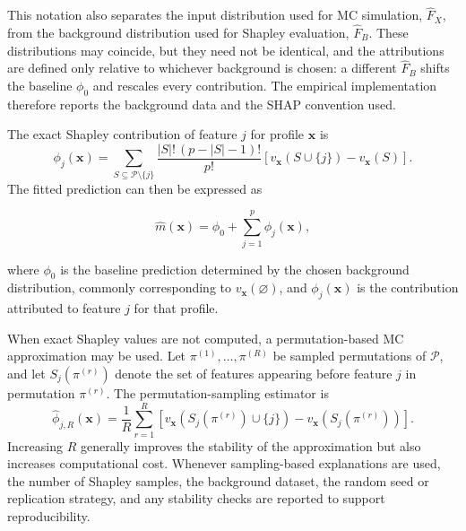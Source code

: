 This notation also separates the input distribution used for MC
simulation, \(\widehat{F}_{X}\), from the background distribution used for
Shapley evaluation, \(\widehat{F}_{B}\). These distributions may coincide,
but they need not be identical, and the attributions are defined only
relative to whichever background is chosen: a different \(\widehat{F}_{B}\)
shifts the baseline \(\phi_{0}\) and rescales every contribution. The
empirical implementation therefore reports the background data and the
SHAP convention used.

\noindent
The exact Shapley contribution of feature \(j\) for profile \(\mathbf{x}\) is
\begin{equation}
\label{eq:shapley_exact}
      \phi_j(\mathbf{x})
      =
      \sum_{S\subseteq\mathcal{P}\setminus\{j\}}
      \frac{|S|!\,(p-|S|-1)!}{p!}
      \left[
          v_{\mathbf{x}}(S\cup\{j\})
          -
          v_{\mathbf{x}}(S)
      \right].
\end{equation}
The fitted prediction can then be expressed as

\begin{equation}
\label{eq:shapley_decomp}
      \widehat{m}(\mathbf{x})
      =
      \phi_0
      +
      \sum_{j=1}^{p}
      \phi_j(\mathbf{x}),
\end{equation}

where \(\phi_0\) is the baseline prediction determined by the chosen background
distribution, commonly corresponding to \(v_{\mathbf{x}}(\varnothing)\), and
\(\phi_j(\mathbf{x})\) is the contribution attributed to feature \(j\) for that
profile.

  \noindent
  When exact Shapley values are not computed, a permutation-based MC
  approximation may be used. Let
  \(\pi^{(1)},\ldots,\pi^{(R)}\) be sampled permutations of \(\mathcal{P}\), and
  let \(S_j(\pi^{(r)})\) denote the set of features appearing before feature \(j\)
  in permutation \(\pi^{(r)}\). The permutation-sampling estimator is
  \begin{equation}
  \label{eq:shapley_perm_estimator}
      \widehat{\phi}_{j,R}(\mathbf{x})
      =
      \frac{1}{R}
      \sum_{r=1}^{R}
      \left[
          v_{\mathbf{x}}
          \!\left(
              S_j(\pi^{(r)})\cup\{j\}
          \right)
          -
          v_{\mathbf{x}}
          \!\left(
              S_j(\pi^{(r)})
          \right)
      \right].
  \end{equation}
  Increasing \(R\) generally improves the stability of the approximation but also
  increases computational cost. Whenever sampling-based explanations are used, the
  number of Shapley samples, the background dataset, the random seed or
  replication strategy, and any stability checks are reported to support
  reproducibility.


